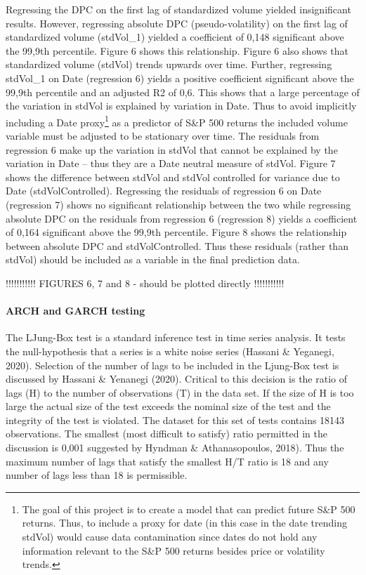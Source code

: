 \documentclass[11pt,preprint, authoryear]{elsarticle}
\numberwithin{equation}{section}
\numberwithin{figure}{section}
\numberwithin{table}{section}
\let\rmarkdownfootnote\footnote%
\def\footnote{\protect\rmarkdownfootnote}
\begin{document}
Regressing the DPC on the first lag of standardized volume yielded
insignificant results. However, regressing absolute DPC
(pseudo-volatility) on the first lag of standardized volume (stdVol\_1)
yielded a coefficient of 0,148 significant above the 99,9th percentile.
Figure 6 shows this relationship. Figure 6 also shows that standardized
volume (stdVol) trends upwards over time. Further, regressing stdVol\_1
on Date (regression 6) yields a positive coefficient significant above
the 99,9th percentile and an adjusted R2 of 0,6. This shows that a large
percentage of the variation in stdVol is explained by variation in Date.
Thus to avoid implicitly including a Date proxy\footnote{The goal of
  this project is to create a model that can predict future S\&P 500
  returns. Thus, to include a proxy for date (in this case in the date
  trending stdVol) would cause data contamination since dates do not
  hold any information relevant to the S\&P 500 returns besides price or
  volatility trends.} as a predictor of S\&P 500 returns the included
volume variable must be adjusted to be stationary over time. The
residuals from regression 6 make up the variation in stdVol that cannot
be explained by the variation in Date -- thus they are a Date neutral
measure of stdVol. Figure 7 shows the difference between stdVol and
stdVol controlled for variance due to Date (stdVolControlled).
Regressing the residuals of regression 6 on Date (regression 7) shows no
significant relationship between the two while regressing absolute DPC
on the residuals from regression 6 (regression 8) yields a coefficient
of 0,164 significant above the 99,9th percentile. Figure 8 shows the
relationship between absolute DPC and stdVolControlled. Thus these
residuals (rather than stdVol) should be included as a variable in the
final prediction data.

!!!!!!!!!!! FIGURES 6, 7 and 8 - should be plotted directly !!!!!!!!!!!

\hypertarget{arch-and-garch-testing}{%
\paragraph{ARCH and GARCH testing}\label{arch-and-garch-testing}}

The LJung-Box test is a standard inference test in time series analysis.
It tests the null-hypothesis that a series is a white noise series
(Hassani \& Yeganegi, 2020). Selection of the number of lags to be
included in the Ljung-Box test is discussed by Hassani \& Yenanegi
(2020). Critical to this decision is the ratio of lags (H) to the number
of observations (T) in the data set. If the size of H is too large the
actual size of the test exceeds the nominal size of the test and the
integrity of the test is violated. The dataset for this set of tests
contains 18143 observations. The smallest (most difficult to satisfy)
ratio permitted in the discussion is 0,001 suggested by Hyndman \&
Athanasopoulos, 2018). Thus the maximum number of lags that satisfy the
smallest H/T ratio is 18 and any number of lags less than 18 is
permissible.
\end{document}
